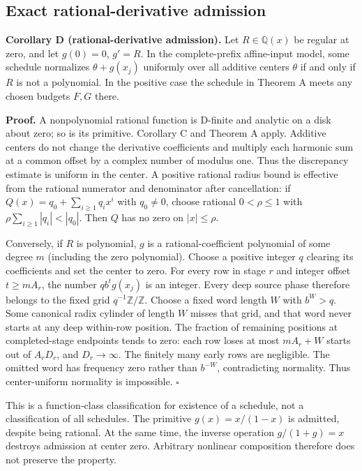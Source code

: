 \documentclass[11pt,a4paper]{article}
\begin{document}
\subsection{Exact rational-derivative
admission}\label{exact-rational-derivative-admission}

\textbf{Corollary D (rational-derivative admission).} Let
\(R\in\mathbb Q(x)\) be regular at zero, and let \(g(0)=0\), \(g'=R\).
In the complete-prefix affine-input model, some schedule normalizes
\(\theta+g(x_j)\) uniformly over all additive centers \(\theta\) if and
only if \(R\) is not a polynomial. In the positive case the schedule in
Theorem A meets any chosen budgets \(F,G\) there.

\textbf{Proof.} A nonpolynomial rational function is D-finite and
analytic on a disk about zero; so is its primitive. Corollary C and
Theorem A apply. Additive centers do not change the derivative
coefficients and multiply each harmonic sum at a common offset by a
complex number of modulus one. Thus the discrepancy estimate is uniform
in the center. A positive rational radius bound is effective from the
rational numerator and denominator after cancellation: if
\(Q(x)=q_0+\sum_{i\ge1}q_ix^i\) with \(q_0\ne0\), choose rational
\(0< \rho\le1\) with \(\rho\sum_{i\ge1}|q_i|< |q_0|\). Then \(Q\) has no
zero on \(|x|\le\rho\).

Conversely, if \(R\) is polynomial, \(g\) is a rational-coefficient
polynomial of some degree \(m\) (including the zero polynomial). Choose
a positive integer \(q\) clearing its coefficients and set the center to
zero. For every row in stage \(r\) and integer offset \(t\ge mA_r\), the
number \(q b^t g(x_j)\) is an integer. Every deep source phase therefore
belongs to the fixed grid \(q^{-1}\mathbb Z/\mathbb Z\). Choose a fixed
word length \(W\) with \(b^W>q\). Some canonical radix cylinder of
length \(W\) misses that grid, and that word never starts at any deep
within-row position. The fraction of remaining positions at
completed-stage endpoints tends to zero: each row loses at most
\(mA_r+W\) starts out of \(A_rD_r\), and \(D_r\to\infty\). The finitely
many early rows are negligible. The omitted word has frequency zero
rather than \(b^{-W}\), contradicting normality. Thus center-uniform
normality is impossible. \(\square\)

This is a function-class classification for existence of a schedule, not
a classification of all schedules. The primitive \(g(x)=x/(1-x)\) is
admitted, despite being rational. At the same time, the inverse
operation \(g/(1+g)=x\) destroys admission at center zero. Arbitrary
nonlinear composition therefore does not preserve the property.
\end{document}
